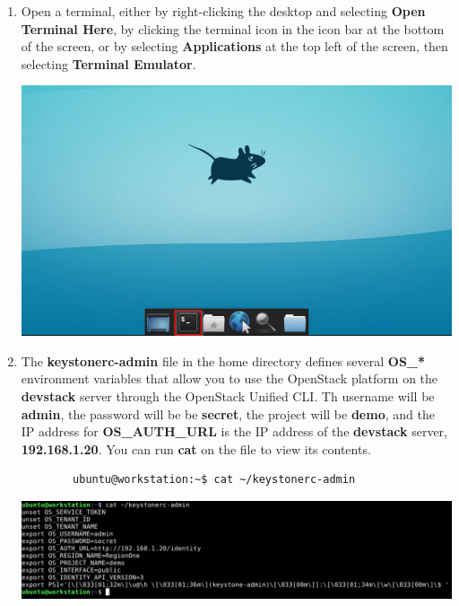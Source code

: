 \documentclass[letterpaper, 12pt]{article}
\begin{document}
\begin{enumerate}
    \item Open a terminal, either by right-clicking the desktop and selecting \textbf{Open Terminal Here}, by clicking
    the terminal icon in the icon bar at the bottom of the screen, or by selecting \textbf{Applications} at the top
    left of the screen, then selecting \textbf{Terminal Emulator}.

    \begin{center}
        \includegraphics[width=\linewidth]{images/part2/step1.png}
    \end{center}

    \item The \textbf{keystonerc-admin} file in the home directory defines several \textbf{OS\_*} environment variables
    that allow you to use the OpenStack platform on the \textbf{devstack} server through the OpenStack Unified CLI. Th
     username will be \textbf{admin}, the password will be be \textbf{secret}, the project will be \textbf{demo}, and
     the IP address for \textbf{OS\_AUTH\_URL} is the IP address of the \textbf{devstack} server, \textbf{192.168.1.20}.
     You can run \textbf{cat} on the file to view its contents.
    \begin{lstlisting}
        ubuntu@workstation:~$ cat ~/keystonerc-admin
    \end{lstlisting}

    \begin{center}
        \includegraphics[width=\linewidth]{images/part2/step2.png}
    \end{center}


\end{enumerate}
\end{document}
